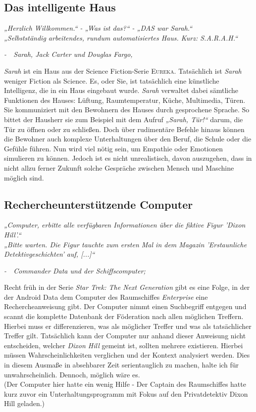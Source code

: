 \documentclass[12pt,twoside]{article}
\theoremstyle{plain}
\theoremstyle{definition}
\theoremstyle{remark}
\begin{document}
\subsection{Das intelligente Haus}
\label{ssec:sarah}
\textit{„Herzlich Willkommen.“ - „Was ist das?“ - „DAS war Sarah.“\\
        „Selbstständig arbeitendes, rundum automatisiertes Haus. Kurz: S.A.R.A.H.“}
\begin{flushright}
    \textit{-~~Sarah, Jack Carter und Douglas Fargo, \cite{EUR103}}
\end{flushright}
\textit{Sarah} ist ein Haus aus der Science Fiction-Serie \textsc{Eureka}.
Tatsächlich ist \textit{Sarah} weniger Fiction als Science.
Es, oder Sie, ist tatsächlich eine künstliche Intelligenz, die in ein Haus eingebaut wurde.
\textit{Sarah} verwaltet dabei sämtliche Funktionen des Hauses: Lüftung, Raumtemperatur, Küche, Multimedia, Türen.
Sie kommuniziert mit den Bewohnern des Hauses durch gesprochene Sprache.
So bittet der Hausherr sie zum Beispiel mit dem Aufruf \textit{„Sarah, Tür!“} darum, die Tür zu öffnen oder zu schließen.
Doch über rudimentäre Befehle hinaus können die Bewohner auch komplexe Unterhaltungen über den Beruf, die Schule oder die Gefühle führen.
Nun wird viel nötig sein, um Empathie oder Emotionen simulieren zu können.
Jedoch ist es nicht unrealistisch, davon auszugehen, dass in nicht allzu ferner Zukunft solche Gespräche zwischen Mensch und Maschine möglich sind.
\subsection{Rechercheunterstützende Computer}
\label{ssec:data}
\textit{„Computer, erbitte alle verfügbaren Informationen über die fiktive Figur 'Dixon Hill'.“\\
        „Bitte warten. Die Figur tauchte zum ersten Mal in dem Magazin 'Erstaunliche Detektivgeschichten' auf, [...]“}
\begin{flushright}
    \textit{-~~Commander Data und der Schiffscomputer; \cite{TNG112}}
\end{flushright}
Recht früh in der Serie \textit{Star Trek: The Next Generation} gibt es eine Folge, in der der Android Data dem Computer des Raumschiffes \textit{Enterprise} eine Rechercheanweisung gibt.
Der Computer nimmt einen Suchbegriff entgegen und scannt die komplette Datenbank der Föderation nach allen möglichen Treffern.
Hierbei muss er differenzieren, was als möglicher Treffer und was als tatsächlicher Treffer gilt.
Tatsächlich kann der Computer nur anhand dieser Anweisung nicht entscheiden, welcher \textit{Dixon Hill} gemeint ist, sollten mehrere existieren.
Hierbei müssen Wahrscheinlichkeiten verglichen und der Kontext analysiert werden.
Dies in diesem Ausmaße in absehbarer Zeit serientauglich zu machen, halte ich für unwahrscheinlich. Dennoch, möglich wäre es.\\
(Der Computer hier hatte ein wenig Hilfe - Der Captain des Raumschiffes hatte kurz zuvor ein Unterhaltungsprogramm mit Fokus auf den Privatdetektiv Dixon Hill geladen.)
\end{document}
